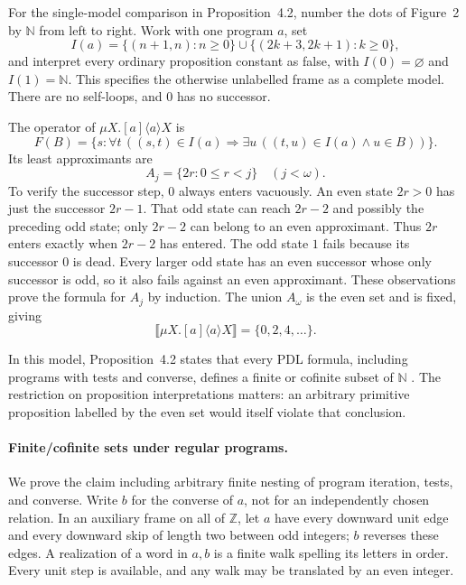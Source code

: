 For the single-model comparison in Proposition~4.2,
number the dots of Figure~2 by \(\mathbb N\) from left
to right. Work with one program \(a\), set
\[
 I(a)=\{(n+1,n):n\geq0\}
       \cup\{(2k+3,2k+1):k\geq0\},
\]
and interpret every ordinary proposition constant
as false, with \(I(0)=\varnothing\) and \(I(1)=\mathbb N\).
This specifies the otherwise unlabelled frame as a
complete model. There are no self-loops, and \(0\)
has no successor.

The operator of \(\mu X.[a]\langle a\rangle X\) is
\[
 F(B)=\{s:\forall t\,((s,t)\in I(a)\Rightarrow
                    \exists u\,((t,u)\in I(a)\land u\in B))\}.
\]
Its least approximants are
\[
 A_j=\{2r:0\leq r<j\}\quad(j<\omega).
\]
To verify the successor step, \(0\) always enters
vacuously. An even state \(2r>0\) has just the
successor \(2r-1\). That odd state can reach
\(2r-2\) and possibly the preceding odd state;
only \(2r-2\) can belong to an even approximant.
Thus \(2r\) enters exactly when \(2r-2\) has entered.
The odd state \(1\) fails because its successor \(0\)
is dead. Every larger odd state has an even successor
whose only successor is odd, so it also fails
against an even approximant. These observations
prove the formula for \(A_j\) by induction.
The union \(A_\omega\) is the even set and is fixed,
giving
\[
 \llbracket\mu X.[a]\langle a\rangle X\rrbracket
       =\{0,2,4,\ldots\}.
\]

In this model, Proposition~4.2 states that every PDL
formula, including programs with tests and converse,
defines a finite or cofinite subset of \(\mathbb N\)
\cite[prop.~4.2 and fig.~2, pp.~340--341]{Kozen1983}.
The restriction on proposition interpretations matters:
an arbitrary primitive proposition labelled by the
even set would itself violate that conclusion.

\paragraph{Finite/cofinite sets under regular programs.}
\label{sec:p09-kozen-finite-cofinite}
We prove the claim including arbitrary finite nesting
of program iteration, tests, and converse. Write \(b\)
for the converse of \(a\), not for an independently
chosen relation. In an auxiliary frame on all of
\(\mathbb Z\), let \(a\) have every downward unit
edge and every downward skip of length two between
odd integers; \(b\) reverses these edges. A realization
of a word in \(a,b\) is a finite walk spelling its
letters in order. Every unit step is available,
and any walk may be translated by an even integer.

